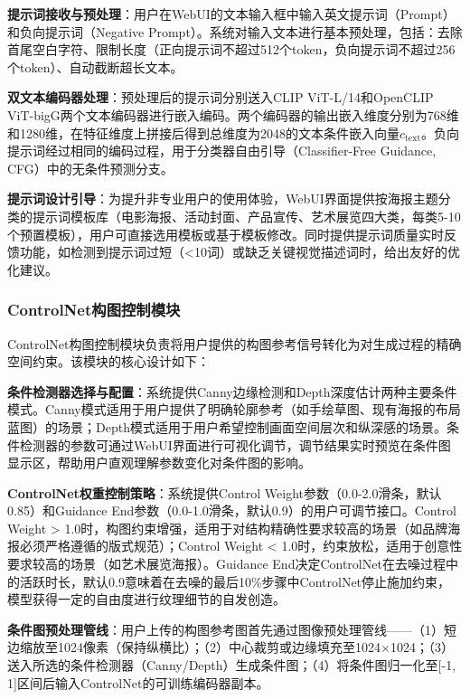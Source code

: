 \documentclass[12pt,a4paper]{ctexart}
\newcommand{\controlnet}{ControlNet}
\begin{document}
\textbf{提示词接收与预处理}：用户在WebUI的文本输入框中输入英文提示词（Prompt）和负向提示词（Negative Prompt）。系统对输入文本进行基本预处理，包括：去除首尾空白字符、限制长度（正向提示词不超过512个token，负向提示词不超过256个token）、自动截断超长文本。

\textbf{双文本编码器处理}：预处理后的提示词分别送入CLIP ViT-L/14和OpenCLIP ViT-bigG两个文本编码器进行嵌入编码。两个编码器的输出嵌入维度分别为768维和1280维，在特征维度上拼接后得到总维度为2048的文本条件嵌入向量$c_{\text{text}}$。负向提示词经过相同的编码过程，用于分类器自由引导（Classifier-Free Guidance, CFG）中的无条件预测分支。

\textbf{提示词设计引导}：为提升非专业用户的使用体验，WebUI界面提供按海报主题分类的提示词模板库（电影海报、活动封面、产品宣传、艺术展览四大类，每类5-10个预置模板），用户可直接选用模板或基于模板修改。同时提供提示词质量实时反馈功能，如检测到提示词过短（<10词）或缺乏关键视觉描述词时，给出友好的优化建议。

\subsubsection{ControlNet构图控制模块}

\controlnet{}构图控制模块负责将用户提供的构图参考信号转化为对生成过程的精确空间约束。该模块的核心设计如下：

\textbf{条件检测器选择与配置}：系统提供Canny边缘检测和Depth深度估计两种主要条件模式。Canny模式适用于用户提供了明确轮廓参考（如手绘草图、现有海报的布局蓝图）的场景；Depth模式适用于用户希望控制画面空间层次和纵深感的场景。条件检测器的参数可通过WebUI界面进行可视化调节，调节结果实时预览在条件图显示区，帮助用户直观理解参数变化对条件图的影响。

\textbf{ControlNet权重控制策略}：系统提供Control Weight参数（0.0-2.0滑条，默认0.85）和Guidance End参数（0.0-1.0滑条，默认0.9）的用户可调节接口。Control Weight > 1.0时，构图约束增强，适用于对结构精确性要求较高的场景（如品牌海报必须严格遵循的版式规范）；Control Weight < 1.0时，约束放松，适用于创意性要求较高的场景（如艺术展览海报）。Guidance End决定\controlnet{}在去噪过程中的活跃时长，默认0.9意味着在去噪的最后10\%步骤中\controlnet{}停止施加约束，模型获得一定的自由度进行纹理细节的自发创造。

\textbf{条件图预处理管线}：用户上传的构图参考图首先通过图像预处理管线——（1）短边缩放至1024像素（保持纵横比）；（2）中心裁剪或边缘填充至1024$\times$1024；（3）送入所选的条件检测器（Canny/Depth）生成条件图；（4）将条件图归一化至[-1, 1]区间后输入\controlnet{}的可训练编码器副本。
\end{document}
